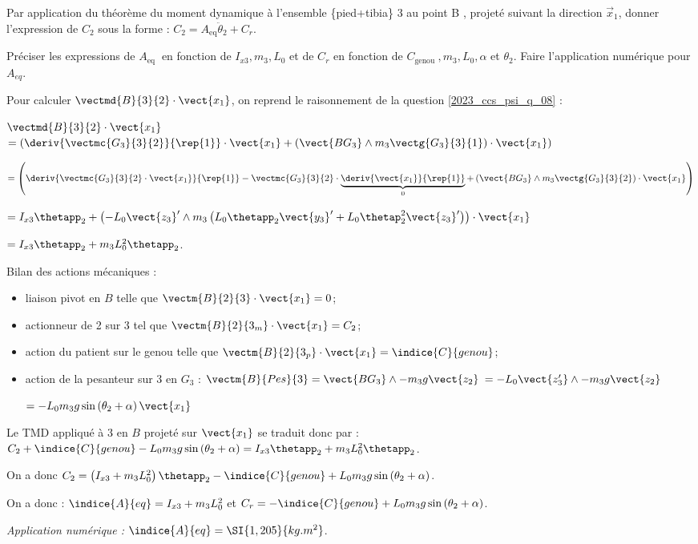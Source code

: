\begin{question}
\label{2023_ccs_psi_q_15}
Par application du théorème du moment dynamique à l'ensemble \{pied+tibia\} 3 au point B , projeté suivant la direction $\vec{x}_{1}$, donner l'expression de $C_{2}$ sous la forme : $C_{2}=A_{\mathrm{eq}} \ddot{\theta}_{2}+C_{r}$.

Préciser les expressions de $A_{\text {eq }}$ en fonction de $I_{x 3}, m_{3}, L_{0}$ et de $C_{r}$ en fonction de $C_{\text {genou }}, m_{3}, L_{0}, \alpha$ et $\theta_{2}$. Faire l'application numérique pour $A_{e q}$.
\end{question}
\ifprof
\begin{corrige}

Pour calculer $\vectmd{B}{3}{2} \cdot \vect{x_1}$, on reprend le raisonnement de la question \ref{2023_ccs_psi_q_08} :  

 $\vectmd{B}{3}{2} \cdot \vect{x_1}$  
$= \left(\deriv{\vectmc{G_3}{3}{2}}{\rep{1}} \cdot \vect{x_1} + \left(\vect{BG_3} \wedge m_3 \vectg{G_3}{3}{1}\right)\cdot \vect{x_1} \right)  $

$= \left(\deriv{\vectmc{G_3}{3}{2}\cdot \vect{x_1}}{\rep{1}} - \vectmc{G_3}{3}{2}\cdot \underbrace{\deriv{ \vect{x_1}}{\rep{1}}}_{0}   + \left(\vect{BG_3} \wedge m_3 \vectg{G_3}{3}{2}\right)\cdot \vect{x_1} \right)  $

$=I_{x3}\thetapp_2 +\left( -L_0 \vect{z_3}'	 \wedge m_3  \left( L_0 \thetapp_2 \vect{y_3}' +L_0 \thetap_2^2 \vect{z_3}' \right)\right)\cdot \vect{x_1}$


$=I_{x3}\thetapp_2 + m_3 L_0^2 \thetapp_2  $.

Bilan des actions mécaniques : 
\begin{itemize}
\item liaison pivot en $B$ telle que $\vectm{B}{2}{3}\cdot \vect{x_1} = 0$;
\item actionneur de 2 sur 3 tel que  $\vectm{B}{2}{3_m}\cdot \vect{x_1} = C_2$;
\item action du patient sur le genou telle que  $\vectm{B}{2}{3_p}\cdot \vect{x_1} = \indice{C}{genou}$;
\item action de la pesanteur sur 3 en $G_3$ : $\vectm{B}{Pes}{3} = \vect{BG_3}\wedge -m_3 g\vect{z_2}$ $= -L_0 \vect{z_3'}\wedge -m_3 g\vect{z_2}$

$= - L_0 m_3 g \sin\left(\theta_2 + \alpha\right)\vect{x_1}$
\end{itemize}

Le TMD appliqué à 3 en $B$ projeté sur $\vect{x_1}$ se traduit donc par : 
$C_2 +\indice{C}{genou} - L_0 m_3 g \sin\left(\theta_2 + \alpha\right)=I_{x3}\thetapp_2 + m_3 L_0^2 \thetapp_2  $.

On a donc $C_2 = \left( I_{x3} + m_3 L_0^2 \right)\thetapp_2  - \indice{C}{genou} + L_0 m_3 g \sin\left(\theta_2 + \alpha\right) $.

On a donc : $\indice{A}{eq} = I_{x3} + m_3 L_0^2$ et $C_r =  - \indice{C}{genou} + L_0 m_3 g \sin\left(\theta_2 + \alpha\right)$.


\textit{Application numérique :} $\indice{A}{eq} =\SI{1,205}{kg.m^2}$.

\end{corrige}
